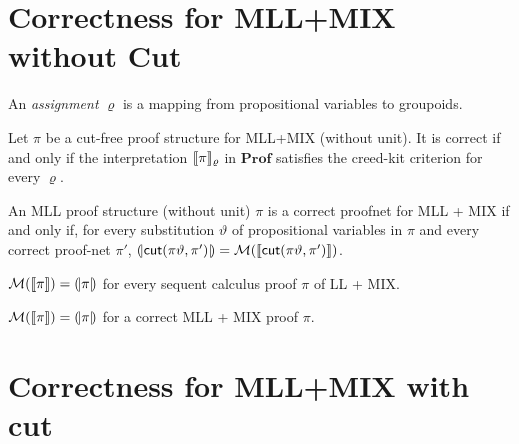\section{Correctness for \textsf{MLL+MIX} without Cut}


An \emph{assignment} \( \varrho \) is a mapping from propositional variables to groupoids.

\begin{theorem}
    Let \( \pi \) be a cut-free proof structure for \textsf{MLL+MIX} (without unit).
    It is correct if and only if the interpretation \( \llbracket{\pi}\rrbracket_\varrho \) in \( \mathbf{Prof} \) satisfies the creed-kit criterion for every \( \varrho \).
\end{theorem}


\begin{theorem}
    An MLL proof structure (without unit) \( \pi \) is a correct proofnet for MLL + MIX if and only if, for every substitution \( \vartheta \) of propositional variables in \( \pi \) and every correct proof-net \( \pi' \), \( (\!|{\mathsf{cut}(\pi\vartheta, \pi')}|\!) = \mathcal{M}({\llbracket{\mathsf{cut}(\pi\vartheta, \pi')}\rrbracket}) \). 
\end{theorem}


\begin{corollary}
    \( \mathcal{M}({\llbracket{\pi}\rrbracket}) = (\!|{\pi}|\!) \) for every sequent calculus proof \( \pi \) of LL + MIX.
\end{corollary}
\begin{corollary}
    \( \mathcal{M}({\llbracket{\pi}\rrbracket}) = (\!|{\pi}|\!) \) for a correct MLL + MIX proof \( \pi \). 
\end{corollary}



\section{Correctness for MLL+MIX with \textsf{cut}}



